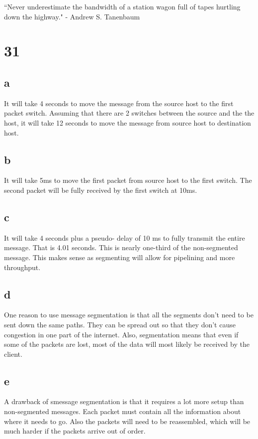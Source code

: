 \documentclass[12pt,letterpaper]{article}
\begin{document}
``Never underestimate the bandwidth of a station wagon full of tapes hurtling down the highway." - Andrew S. Tanenbaum

\section*{31}
\subsection*{a}

It will take 4 seconds to move the message from the source host to the first packet switch.
Assuming that there are 2 switches between the source and the the host, it will take 12 seconds to move the message from source host to destination host.
\subsection*{b}

It will take 5ms to move the first packet from source host to the first switch.
The second packet will be fully received by the first switch at 10ms.
\subsection*{c}

It will take 4 seconds plus a pseudo- delay of 10 ms to fully transmit the entire message.
That is 4.01 seconds.
This is nearly one-third of the non-segmented message.
This makes sense as segmenting will allow for pipelining and more throughput.
\subsection*{d}

One reason to use message segmentation is that all the segments don't need to be sent down the same paths.
They can be spread out so that they don't cause congestion in one part of the internet.
Also, segmentation means that even if some of the packets are lost, most of the data will most likely be received by the client.

\subsection*{e}

A drawback of smessage segmentation is that it requires a lot more setup than non-segmented messages. 
Each packet must contain all the information about where it needs to go.
Also the packets will need to be reassembled, which will be much harder if the packets arrive out of order.
\end{document}
